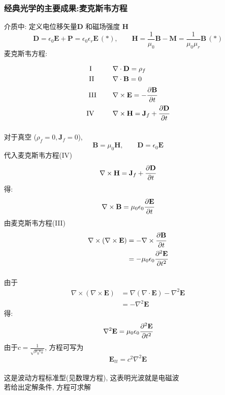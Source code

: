 \begin{frame}
      \frametitle{经典光学的主要成果:麦克斯韦方程}
    介质中: 定义电位移矢量$\mathbf{D}$ 和磁场强度 $\mathbf{H}$
\[ \mathbf{D}=\epsilon_0 \mathbf{E} + \mathbf{P} = \epsilon_0 \epsilon_r \mathbf{E} \, (*),  \qquad \mathbf{H}=\frac{1}{\mu_0} \mathbf{B} -\mathbf{M}= \frac{1}{\mu_0\mu_r}\mathbf{B} \, (*)\]
麦克斯韦方程:

\[ \begin{aligned}
        \text{I}~~~ \hspace*{2em}&\nabla \cdot \mathbf{D} =\rho _f  \\  
        \text{II}~~ \hspace*{2em}&\nabla \cdot \mathbf{B} = 0  \\  
        \text{III}~ \hspace*{2em}&\nabla \times  \mathbf{E} = -\cfrac{\partial \mathbf{B}}{\partial t }  \\  
        \text{IV~}~ \hspace*{2em}&\nabla \times  \mathbf{H} = \mathbf{J}_f +  \cfrac{\partial \mathbf{D}}{\partial t } 
    \end{aligned} \]
\end{frame}

\begin{frame}
      \frametitle{}
    对于真空 ($\rho _f =0, \mathbf{J}_f =0 $),  \[ \mathbf{B} = \mu_0 \mathbf{H}, \qquad  \mathbf{D} = \epsilon_0 \mathbf{E} \]
代入麦克斯韦方程(IV)
 \[ \nabla \times  \mathbf{H} = \mathbf{J}_f +  \cfrac{\partial \mathbf{D}}{\partial t } \]
得: \[ \nabla \times \mathbf{B} = \mu_0\epsilon_0 \cfrac{\partial \mathbf{E}} {\partial t } \]
由麦克斯韦方程(III)
\[    
\begin{aligned}
  \nabla \times (\nabla \times  \mathbf{E}) &= - \nabla \times \cfrac{\partial \mathbf{B}}{\partial t } \\
  &= - \mu_0\epsilon_0  \cfrac{\partial ^2 \mathbf{E}} {\partial t^2 }
\end{aligned} \]  
\end{frame}

\begin{frame}
      \frametitle{}
    由于
  \[
  \begin{aligned}
      \nabla \times (\nabla \times  \mathbf{E}) &=  \nabla (\nabla \cdot  \mathbf{E})- \nabla^2 \mathbf{E} \\
      &= - \nabla^2 \mathbf{E} 
  \end{aligned} \]
  得:
  \[
  \nabla^2 \mathbf{E}= \mu_0\epsilon_0 \cfrac{\partial ^2 \mathbf{E}} {\partial t^2 }\]
  由于$ c= \frac{1}{\sqrt{\mu_0\epsilon_0}} $, 方程可写为
  \[\boxed{\mathbf{E}_{tt} =c^2\nabla^2 \mathbf{E}}\]
  ~~\\
  这是波动方程标准型(见数理方程), 这表明光波就是电磁波 \\ 若给出定解条件, 方程可求解 \\  
\end{frame}

